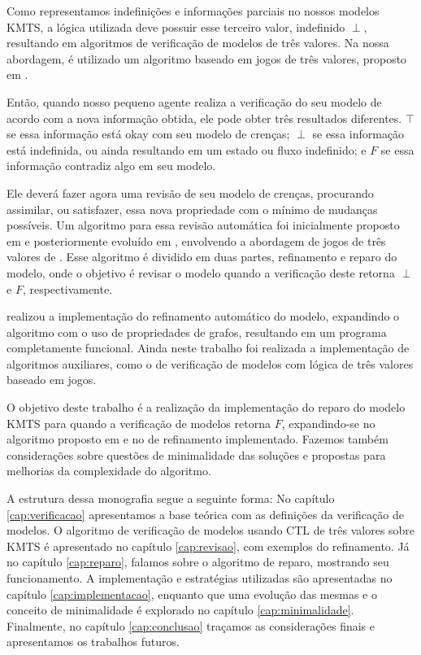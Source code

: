 \documentclass[normaltoc,capchap,capsec,times]{abnt}
\begin{document}
Como representamos indefinições e informações parciais no nossos modelos KMTS, a lógica utilizada deve possuir esse terceiro valor, indefinido $\perp$, resultando em algoritmos de verificação de modelos de três valores. Na nossa abordagem, é utilizado um algoritmo baseado em jogos de três valores, proposto em \cite{grumberglosing}.

Então, quando nosso pequeno agente realiza a verificação do seu modelo de acordo com a nova informação obtida, ele pode obter três resultados diferentes. $\top$ se essa informação está okay com seu modelo de crenças; $\perp$ se essa informação está indefinida, ou ainda resultando em um estado ou fluxo indefinido; e $F$ se essa informação contradiz algo em seu modelo.

Ele deverá fazer agora uma revisão de seu modelo de crenças, procurando assimilar, ou satisfazer, essa nova propriedade com o mínimo de mudanças possíveis. Um algoritmo para essa revisão automática foi inicialmente proposto em \cite{wasserman} e posteriormente evoluído em \cite{aline}, envolvendo a abordagem de jogos de três valores de \cite{grumberglosing}. Esse algoritmo é dividido em duas partes, refinamento e reparo do modelo, onde o objetivo é revisar o modelo quando a verificação deste retorna $\perp$ e $F$, respectivamente.

\cite{jandson} realizou a implementação do refinamento automático do modelo, expandindo o algoritmo com o uso de propriedades de grafos, resultando em um programa completamente funcional. Ainda neste trabalho foi realizada a implementação de algoritmos auxiliares, como o de verificação de modelos com lógica de três valores baseado em jogos.

O objetivo deste trabalho é a realização da implementação do reparo do modelo KMTS para quando a verificação de modelos retorna $F$, expandindo-se no algoritmo proposto em \cite{aline} e no de refinamento implementado. Fazemos também considerações sobre questões de minimalidade das soluções e propostas para melhorias da complexidade do algoritmo.

A estrutura dessa monografia segue a seguinte forma: No capítulo \ref{cap:verificacao} apresentamos a base teórica com as definições da verificação de modelos. O algoritmo de verificação de modelos usando CTL de três valores sobre KMTS é apresentado no capítulo \ref{cap:revisao}, com exemplos do refinamento. Já no capítulo \ref{cap:reparo}, falamos sobre o algoritmo de reparo, mostrando seu funcionamento. A implementação e estratégias utilizadas são apresentadas no capítulo \ref{cap:implementacao}, enquanto que uma evolução das mesmas e o conceito de minimalidade é explorado no capítulo \ref{cap:minimalidade}. Finalmente, no capítulo \ref{cap:conclusao} traçamos as considerações finais e apresentamos os trabalhos futuros.
\end{document}
